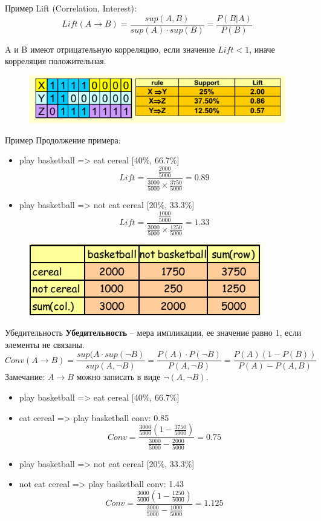 \documentclass{beamer}
\begin{document}
\begin{frame}{Пример}
	Lift (Correlation, Interest):
	\[Lift(A \rightarrow B)=\frac{sup(A,B)}{sup(A)\cdot sup(B)}=\frac{P(B|A)}{P(B)}\]
	
	A и B имеют отрицательную корреляцию, если значение $Lift<1$, иначе корреляция положительная.

	\begin{figure}[h]
		\centering
		\includegraphics[scale=0.8]{images/lec08-pic22.png}
	\end{figure}
\end{frame}

\begin{frame}{Пример}
	Продолжение примера:
	\begin{itemize}
		\item play basketball => eat cereal [40\%, 66.7\%]
		\[ Lift=\frac{\frac{2000}{5000}}{\frac{3000}{5000} \times \frac{3750}{5000}} = 0.89\]
		\item play basketball => not eat cereal [20\%, 33.3\%]
		\[ Lift=\frac{\frac{1000}{5000}}{\frac{3000}{5000} \times \frac{1250}{5000}} = 1.33\]
	\end{itemize}	
	\begin{figure}[h]
		\centering
		\includegraphics[scale=0.7]{images/lec08-pic23.png}
	\end{figure}
\end{frame}

\begin{frame}{Убедительность}
	\textbf{Убедительность} -- мера импликации, ее значение равно 1, если элементы не связаны.
	\[
	Conv(A\rightarrow B)=\frac{sup(A\cdot sup(\neg B)}{sup(A,\neg B)}=\frac{P(A)\cdot P(\neg B)}{P(A, \neg B)}=\frac{P(A)(1-P(B))}{P(A)-P(A,B)}
	\]
	Замечание: $A \rightarrow B$ можно записать в виде $\neg(A,\neg B)$.	
	\begin{itemize}
		\item play basketball => eat cereal [40\%, 66.7\%]
		\item eat cereal => play basketball conv: 0.85		
		\[Conv=\frac{\frac{3000}{5000}\left(1-\frac{3750}{5000}\right)}{\frac{3000}{5000}-\frac{2000}{5000}} = 0.75\]
		\item play basketball => not eat cereal [20\%, 33.3\%]
		\item not eat cereal => play basketball conv: 1.43
		\[Conv=\frac{\frac{3000}{5000}\left(1-\frac{1250}{5000}\right)}{\frac{3000}{5000}-\frac{1000}{5000}} = 1.125\]
	\end{itemize}
\end{frame}
\end{document}
